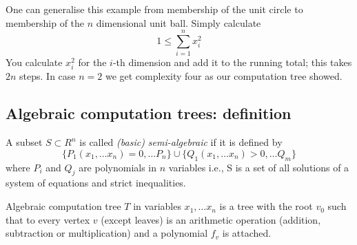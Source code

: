 \begin{center}
\end{center}

\begin{example}
    One can generalise this example from membership of the unit circle to membership
    of the $n$ dimensional unit ball.
    Simply calculate
    $$1 \leq \sum_{i=1}^{n} x_i^2$$
    You calculate $x_i^2$ for the $i$-th dimension and add it to the running total;
    this takes $2n$ steps.
    In case $n = 2$ we get complexity four as our computation tree showed.
\end{example}

\subsection{Algebraic computation trees: definition}
\begin{definition}
    A subset $S \subset R^n$ is called \textit{(basic) semi-algebraic} if it is defined by
    $$\{P_1(x_1,\dots x_n) = 0,\dots P_n\}
    \cup
    \{Q_1(x_1,\dots x_n) > 0,\dots Q_m\}$$
    where $P_i$ and $Q_j$ are polynomials in $n$ variables
    i.e., S is a set of all solutions of a system of equations and strict inequalities.
\end{definition}

Algebraic computation tree $T$ in variables $x_1,\dots x_n$
is a tree with the root $v_0$ such that to every vertex $v$ (except leaves)
is an arithmetic operation (addition, subtraction or multiplication) 
and a polynomial $f_v$ is attached.

